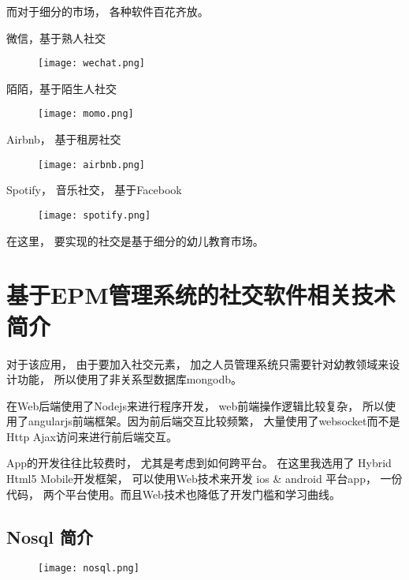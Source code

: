 而对于细分的市场， 各种软件百花齐放。


微信，基于熟人社交

\begin{figure}[H]
	\centering
	\texttt{[image: wechat.png]}
	\label{fig: wechat}
\end{figure}

陌陌，基于陌生人社交


\begin{figure}[H]
	\centering
	\texttt{[image: momo.png]}
	\label{fig: momo}
\end{figure}

Airbnb， 基于租房社交

\begin{figure}[H]
	\centering
	\texttt{[image: airbnb.png]}
	\label{fig: airbnb}
\end{figure}


Spotify， 音乐社交， 基于Facebook

\begin{figure}[H]
	\centering
	\texttt{[image: spotify.png]}
	\label{fig: spotify}
\end{figure}


在这里， 要实现的社交是基于细分的幼儿教育市场。


\section{基于EPM管理系统的社交软件相关技术简介}

对于该应用， 由于要加入社交元素， 加之人员管理系统只需要针对幼教领域来设计功能， 所以使用了非关系型数据库mongodb。 


在Web后端使用了Nodejs来进行程序开发， web前端操作逻辑比较复杂， 所以使用了angularjs前端框架。因为前后端交互比较频繁， 大量使用了websocket而不是Http Ajax访问来进行前后端交互。



App的开发往往比较费时， 尤其是考虑到如何跨平台。 在这里我选用了 Hybrid Html5 Mobile开发框架， 可以使用Web技术来开发 ios \& android 平台app， 一份代码， 两个平台使用。而且Web技术也降低了开发门槛和学习曲线。


\subsection{Nosql 简介}


\begin{figure}[H]
	\centering
	\texttt{[image: nosql.png]}
	\label{fig: nosql}
\end{figure}


